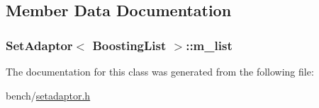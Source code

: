 \subsection{Member Data Documentation}
\hypertarget{classSetAdaptor_3_01BoostingList_01_4_a3286d56d32c5e2288e0800c96375ca93}{
\subsubsection[{m\-\_\-list}]{ {\bf Set\-Adaptor}$<$ {\bf Boosting\-List} $>$\-::m\-\_\-list\hspace{0.3cm}{\ttfamily [private]}}}\label{classSetAdaptor_3_01BoostingList_01_4_a3286d56d32c5e2288e0800c96375ca93}


The documentation for this class was generated from the following file\-:\begin{DoxyCompactItemize}
\item 
bench/\hyperlink{setadaptor_8h}{setadaptor.\-h}\end{DoxyCompactItemize}
